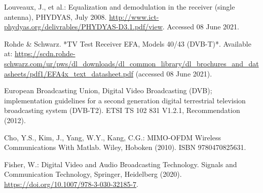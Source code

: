 \documentclass[10pt]{article}
\begin{document}
\begin{thebibliography}{99}
Louveaux, J., et al.: Equalization and demodulation in the receiver (single antenna), PHYDYAS, July 2008. \href{http://www.ict-phydyas.org/delivrables/PHYDYAS-D3.1.pdf/view}{http://www.ict-phydyas.org/delivrables/PHYDYAS-D3.1.pdf/view}. Accessed 08 June 2021.

Rohde \& Schwarz. *TV Test Receiver EFA, Models 40/43 (DVB-T)*. Available at:  
\url{https://scdn.rohde-schwarz.com/ur/pws/dl_downloads/dl_common_library/dl_brochures_and_datasheets/pdf1/EFA4x_text_datasheet.pdf} (accessed 08 June 2021).


European Broadcasting Union, Digital Video Broadcasting (DVB); implementation guidelines for a second generation digital terrestrial television broadcasting system (DVB-T2). ETSI TS 102 831 V1.2.1, Recommendation (2012).

Cho, Y.S., Kim, J., Yang, W.Y., Kang, C.G.: MIMO-OFDM Wireless Communications With Matlab. Wiley, Hoboken (2010). ISBN 9780470825631.

Fisher, W.: Digital Video and Audio Broadcasting Technology. Signals and Communication Technology, Springer, Heidelberg (2020). \href{https://doi.org/10.1007/978-3-030-32185-7}{https://doi.org/10.1007/978-3-030-32185-7}.

\end{thebibliography}

\end{document}
